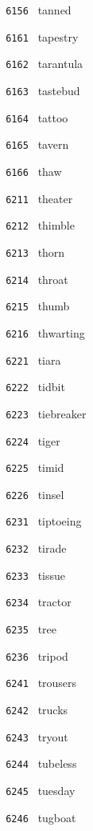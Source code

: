 \documentclass[11pt]{article}
\begin{document}
\begin{multicols}{6}
\noindent \texttt{ 6156 } tanned  \par
\vspace{3mm}
\noindent \texttt{ 6161 } tapestry  \par
\noindent \texttt{ 6162 } tarantula  \par
\noindent \texttt{ 6163 } tastebud  \par
\noindent \texttt{ 6164 } tattoo  \par
\noindent \texttt{ 6165 } tavern  \par
\noindent \texttt{ 6166 } thaw  \par
\noindent \texttt{ 6211 } theater  \par
\noindent \texttt{ 6212 } thimble  \par
\noindent \texttt{ 6213 } thorn  \par
\noindent \texttt{ 6214 } throat  \par
\noindent \texttt{ 6215 } thumb  \par
\noindent \texttt{ 6216 } thwarting  \par
\vspace{3mm}
\noindent \texttt{ 6221 } tiara  \par
\noindent \texttt{ 6222 } tidbit  \par
\noindent \texttt{ 6223 } tiebreaker  \par
\noindent \texttt{ 6224 } tiger  \par
\noindent \texttt{ 6225 } timid  \par
\noindent \texttt{ 6226 } tinsel  \par
\vspace{3mm}
\noindent \texttt{ 6231 } tiptoeing  \par
\noindent \texttt{ 6232 } tirade  \par
\noindent \texttt{ 6233 } tissue  \par
\noindent \texttt{ 6234 } tractor  \par
\noindent \texttt{ 6235 } tree  \par
\noindent \texttt{ 6236 } tripod  \par
\vspace{3mm}
\noindent \texttt{ 6241 } trousers  \par
\noindent \texttt{ 6242 } trucks  \par
\noindent \texttt{ 6243 } tryout  \par
\noindent \texttt{ 6244 } tubeless  \par
\noindent \texttt{ 6245 } tuesday  \par
\noindent \texttt{ 6246 } tugboat  \par

\end{multicols}
\end{document}
